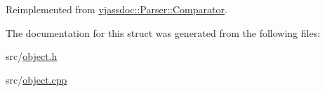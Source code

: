 Reimplemented from \hyperlink{structvjassdoc_1_1Parser_1_1Comparator_c27d6790182d87751bcf134a0d01481a}{vjassdoc::Parser::Comparator}.

The documentation for this struct was generated from the following files:\begin{CompactItemize}
\item 
src/\hyperlink{object_8h}{object.h}\item 
src/\hyperlink{object_8cpp}{object.cpp}\end{CompactItemize}
